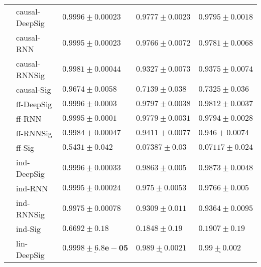 \begin{tabular}{lllll}
       & causal-DeepSig &                           $ 0.9996 \pm 0.00023 $ &                           $ 0.9777 \pm 0.0023 $ &                           $ 0.9795 \pm 0.0018 $ \\
       & causal-RNN &                           $ 0.9995 \pm 0.00023 $ &                           $ 0.9766 \pm 0.0072 $ &                           $ 0.9781 \pm 0.0068 $ \\
       & causal-RNNSig &                           $ 0.9981 \pm 0.00044 $ &                           $ 0.9327 \pm 0.0073 $ &                           $ 0.9375 \pm 0.0074 $ \\
       & causal-Sig &                            $ 0.9674 \pm 0.0058 $ &                            $ 0.7139 \pm 0.038 $ &                            $ 0.7325 \pm 0.036 $ \\
       & ff-DeepSig &                            $ 0.9996 \pm 0.0003 $ &                           $ 0.9797 \pm 0.0038 $ &                           $ 0.9812 \pm 0.0037 $ \\
       & ff-RNN &                            $ 0.9995 \pm 0.0001 $ &                           $ 0.9779 \pm 0.0031 $ &                           $ 0.9794 \pm 0.0028 $ \\
       & ff-RNNSig &                           $ 0.9984 \pm 0.00047 $ &                           $ 0.9411 \pm 0.0077 $ &                            $ 0.946 \pm 0.0074 $ \\
       & ff-Sig &                             $ 0.5431 \pm 0.042 $ &                            $ 0.07387 \pm 0.03 $ &                           $ 0.07117 \pm 0.024 $ \\
       & ind-DeepSig &                           $ 0.9996 \pm 0.00033 $ &                $  \mathbf{ 0.9863 \pm 0.005 } $ &               $  \mathbf{ 0.9873 \pm 0.0048 } $ \\
       & ind-RNN &                           $ 0.9995 \pm 0.00024 $ &                            $ 0.975 \pm 0.0053 $ &                            $ 0.9766 \pm 0.005 $ \\
       & ind-RNNSig &                           $ 0.9975 \pm 0.00078 $ &                            $ 0.9309 \pm 0.011 $ &                           $ 0.9364 \pm 0.0095 $ \\
       & ind-Sig &                              $ 0.6692 \pm 0.18 $ &                             $ 0.1848 \pm 0.19 $ &                             $ 0.1907 \pm 0.19 $ \\
       & lin-DeepSig &  $  \mathbf{ \underline{ 0.9998 \pm 6.8e-05 }} $ &   $  \mathbf{ \underline{ 0.989 \pm 0.0021 }} $ &     $  \mathbf{ \underline{ 0.99 \pm 0.002 }} $ \\

\end{tabular}

